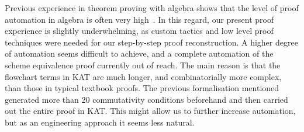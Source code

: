 \documentclass{llncs}
\begin{document}
Previous experience in theorem proving with algebra shows that the
level of proof automation in algebra is often very
high~\cite{HoefnerStruthAuto,GuttmannStruthWeber,FosterStruth}. In
this regard, our present proof experience is slightly underwhelming,
as custom tactics and low level proof techniques were needed for our
step-by-step proof reconstruction. A higher degree of automation seems
difficult to achieve, and a complete automation of the scheme
equivalence proof currently out of reach. The main reason is that the
flowchart terms in KAT are much longer, and combinatorially more
complex, than those in typical textbook proofs. The previous
formalisation mentioned generated more than $20$ commutativity
conditions beforehand and then carried out the entire proof in
KAT. This might allow us to further increase automation, but as an
engineering approach it seems less natural.

\end{document}
